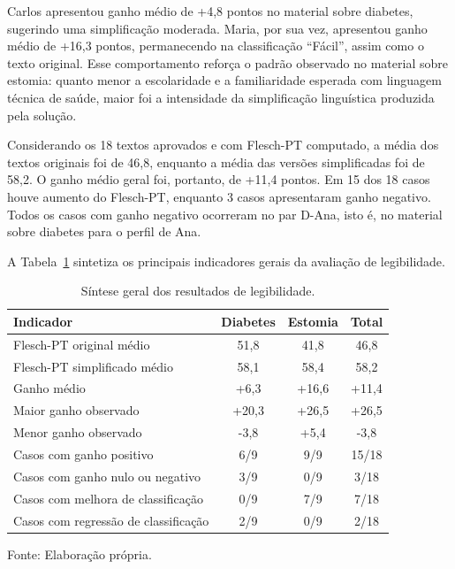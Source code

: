 Carlos apresentou ganho médio de +4,8 pontos no material sobre diabetes, sugerindo uma simplificação moderada. Maria, por sua vez, apresentou ganho médio de +16,3 pontos, permanecendo na classificação ``Fácil'', assim como o texto original. Esse comportamento reforça o padrão observado no material sobre estomia: quanto menor a escolaridade e a familiaridade esperada com linguagem técnica de saúde, maior foi a intensidade da simplificação linguística produzida pela solução.

Considerando os 18 textos aprovados e com Flesch-PT computado, a média dos textos originais foi de 46,8, enquanto a média das versões simplificadas foi de 58,2. O ganho médio geral foi, portanto, de +11,4 pontos. Em 15 dos 18 casos houve aumento do Flesch-PT, enquanto 3 casos apresentaram ganho negativo. Todos os casos com ganho negativo ocorreram no par D-Ana, isto é, no material sobre diabetes para o perfil de Ana.

A Tabela~\ref{tab:sintese-legibilidade} sintetiza os principais indicadores gerais da avaliação de legibilidade.

\begin{table}[htbp]
  \centering
  \caption{Síntese geral dos resultados de legibilidade.}
  \label{tab:sintese-legibilidade}
  \small
  \begin{tabularx}{\textwidth}{Xccc}
    \toprule
    \textbf{Indicador} & \textbf{Diabetes} & \textbf{Estomia} & \textbf{Total} \\
    \midrule
    Flesch-PT original médio & 51,8 & 41,8 & 46,8 \\
    Flesch-PT simplificado médio & 58,1 & 58,4 & 58,2 \\
    Ganho médio & +6,3 & +16,6 & +11,4 \\
    Maior ganho observado & +20,3 & +26,5 & +26,5 \\
    Menor ganho observado & -3,8 & +5,4 & -3,8 \\
    Casos com ganho positivo & 6/9 & 9/9 & 15/18 \\
    Casos com ganho nulo ou negativo & 3/9 & 0/9 & 3/18 \\
    Casos com melhora de classificação & 0/9 & 7/9 & 7/18 \\
    Casos com regressão de classificação & 2/9 & 0/9 & 2/18 \\
    \bottomrule
  \end{tabularx}

  {\footnotesize Fonte: Elaboração própria.}
\end{table}

